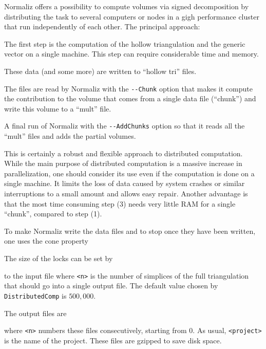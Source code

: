 Normaliz offers a possibility to compute volumes via signed decomposition by distributing the task to several computers or nodes in a gigh performance cluster that run independently of each other. The principal approach:
\begin{arab}
\item The first step is the computation of the hollow triangulation and the generic vector on a single machine. This step can require considerable time and memory.
\item These data (and some more) are written to ``hollow tri'' files.
\item The files are read by Normaliz with the \verb|--Chunk| option that makes it compute the contribution to the volume that comes from a single data file (``chunk'') and write this volume to a ``mult''  file.
\item A final run of Normaliz with the \verb|--AddChunks| option so that it reads all the ``mult'' files and adds the partial volumes.
\end{arab}

This is certainly a  robust and flexible approach to distributed computation. While the main purpose of distributed computation is a massive increase in parallelization, one should consider its use even if the computation is done on a single machine. It limits the loss of data caused by system crashes or similar interruptions to a small amount and allows easy repair. Another advantage is that the most time consuming step (3) needs very little RAM for a single ``chunk'', compared to step (1). 

To make Normaliz write the data files and to stop once they have been written, one uses the cone property
\begin{itemize}
\end{itemize}
The size of the locks can be set by
\begin{itemize}
\end{itemize}
to the input file where \verb|<n>| is the number of simplices of the full triangulation that should go into a single output file.  The default value chosen by \verb|DistributedComp| is $500,000$.

The output files are
\begin{itemize}
\end{itemize}
where \verb|<n>| numbers these files consecutively, starting from $0$. As usual, \verb|<project>| is the name of the project. These files are gzipped to save disk space.

